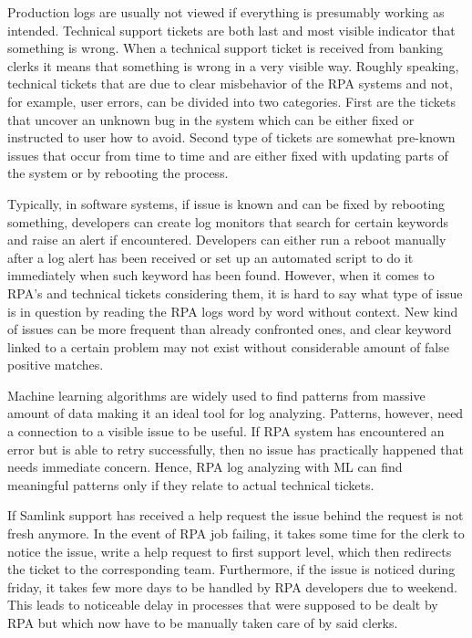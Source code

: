 Production logs are usually not viewed
if everything is presumably working as intended.
Technical support tickets are both
last and most visible indicator
that something is wrong.
When a technical support ticket is received from banking clerks
it means that something is wrong
in a very visible way.
Roughly speaking,
technical tickets that are due to
clear misbehavior of the RPA systems
and not, for example, user errors,
can be divided into two categories.
First are the tickets
that uncover an unknown bug in the system
which can be either fixed
or instructed to user how to avoid.
Second type of tickets are
somewhat pre-known issues
that occur from time to time
and are either fixed with updating parts of the system
or by rebooting the process.

Typically,
in software systems,
if issue is known and can be fixed by rebooting something,
developers can create log monitors
that search for certain keywords
and raise an alert if encountered.
Developers can either run a reboot manually
after a log alert has been received
or set up an automated script to do it immediately
when such keyword has been found.
However,
when it comes to RPA's and technical tickets considering them,
it is hard to say what type of issue is in question
by reading the RPA logs word by word without context.
New kind of issues can be more frequent
than already confronted ones,
and clear keyword linked to
a certain problem may not exist
without considerable amount of false positive matches.

Machine learning algorithms are widely used
to find patterns from massive amount of data
making it an ideal tool for log analyzing.
Patterns, however,
need a connection to a visible issue to be useful.
If RPA system has encountered an error
but is able to retry successfully,
then no issue has practically happened
that needs immediate concern.
Hence,
RPA log analyzing with ML can find meaningful patterns
only if they relate to actual technical tickets.

If Samlink support has received a help request
the issue behind the request is not fresh anymore.
In the event of RPA job failing,
it takes some time for the clerk to notice the issue,
write a help request to first support level,
which then redirects the ticket to the corresponding team.
Furthermore,
if the issue is noticed during friday,
it takes few more days to be handled by RPA developers
due to weekend.
This leads to noticeable delay in processes
that were supposed to be dealt by RPA
but which now have to be manually taken care of
by said clerks.

